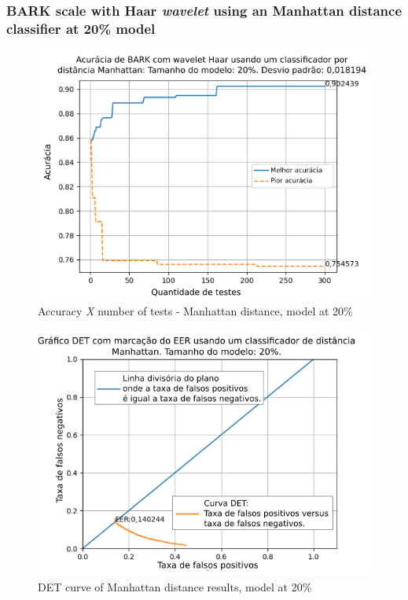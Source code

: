 		\subsubsection{BARK scale with Haar \textit{wavelet} using an Manhattan distance classifier at 20\% model}
			
			
			
			\begin{figure}[!ht]
				\centering
				\includegraphics[width=\linewidth]{images/results/confusionMatrices/classifier_Manhattan_20.png}
				\caption{Accuracy \textit{X} number of tests - Manhattan distance, model at 20\%}
				\label{fig:classifiermanhattan20}
			\end{figure}
			
			\begin{figure}[!h]
				\centering
				\includegraphics[width=.9\linewidth]{images/results/det/DET_for_classifier_Manhattan_20}
				\caption{DET curve of Manhattan distance results, model at 20\%}
				\label{fig:detforclassifiermanhattan20}
			\end{figure}
		
